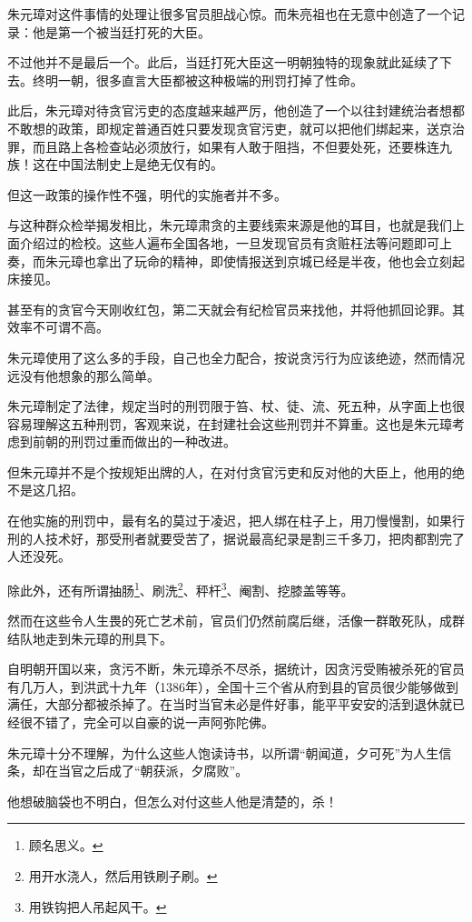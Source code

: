 \begin{multicols}{\theparacolNo}
		朱元璋对这件事情的处理让很多官员胆战心惊。而朱亮祖也在无意中创造了一个记录：他是第一个被当廷打死的大臣。

		不过他并不是最后一个。此后，当廷打死大臣这一明朝独特的现象就此延续了下去。终明一朝，很多直言大臣都被这种极端的刑罚打掉了性命。

		此后，朱元璋对待贪官污吏的态度越来越严厉，他创造了一个以往封建统治者想都不敢想的政策，即规定普通百姓只要发现贪官污吏，就可以把他们绑起来，送京治罪，而且路上各检查站必须放行，如果有人敢于阻挡，不但要处死，还要株连九族！这在中国法制史上是绝无仅有的。

		但这一政策的操作性不强，明代的实施者并不多。

		与这种群众检举揭发相比，朱元璋肃贪的主要线索来源是他的耳目，也就是我们上面介绍过的检校。这些人遍布全国各地，一旦发现官员有贪赃枉法等问题即可上奏，而朱元璋也拿出了玩命的精神，即使情报送到京城已经是半夜，他也会立刻起床接见。

		甚至有的贪官今天刚收红包，第二天就会有纪检官员来找他，并将他抓回论罪。其效率不可谓不高。

		朱元璋使用了这么多的手段，自己也全力配合，按说贪污行为应该绝迹，然而情况远没有他想象的那么简单。

		朱元璋制定了法律，规定当时的刑罚限于笞、杖、徒、流、死五种，从字面上也很容易理解这五种刑罚，客观来说，在封建社会这些刑罚并不算重。这也是朱元璋考虑到前朝的刑罚过重而做出的一种改进。

		但朱元璋并不是个按规矩出牌的人，在对付贪官污吏和反对他的大臣上，他用的绝不是这几招。

		在他实施的刑罚中，最有名的莫过于凌迟，把人绑在柱子上，用刀慢慢割，如果行刑的人技术好，那受刑者就要受苦了，据说最高纪录是割三千多刀，把肉都割完了人还没死。

		除此外，还有所谓抽肠\footnote{顾名思义。}、刷洗\footnote{用开水浇人，然后用铁刷子刷。}、秤杆\footnote{用铁钩把人吊起风干。}、阉割、挖膝盖等等。

		然而在这些令人生畏的死亡艺术前，官员们仍然前腐后继，活像一群敢死队，成群结队地走到朱元璋的刑具下。

		自明朝开国以来，贪污不断，朱元璋杀不尽杀，据统计，因贪污受贿被杀死的官员有几万人，到洪武十九年（1386年），全国十三个省从府到县的官员很少能够做到满任，大部分都被杀掉了。在当时当官未必是件好事，能平平安安的活到退休就已经很不错了，完全可以自豪的说一声阿弥陀佛。

		朱元璋十分不理解，为什么这些人饱读诗书，以所谓“朝闻道，夕可死”为人生信条，却在当官之后成了“朝获派，夕腐败”。

		他想破脑袋也不明白，但怎么对付这些人他是清楚的，杀！


\end{multicols}
